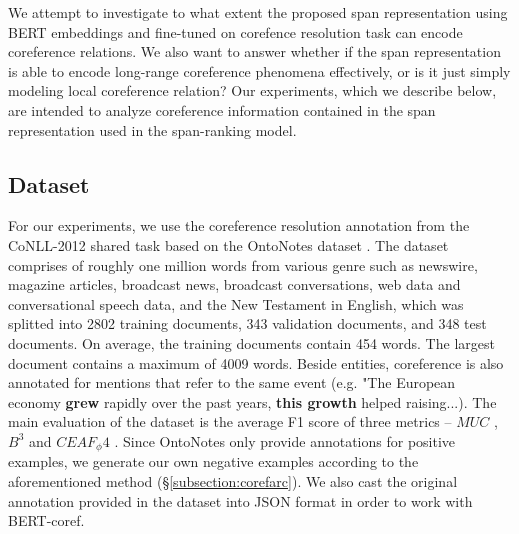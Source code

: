 \documentclass[11pt]{article}
\begin{document}


We attempt to investigate to what extent the proposed span representation using BERT embeddings and fine-tuned on corefence resolution task can encode coreference relations. We also want to answer whether if the span representation is able to encode long-range coreference phenomena effectively, or is it just simply modeling local coreference relation? Our experiments, which we describe below, are intended to analyze coreference information contained in the span representation used in the span-ranking model. 

\subsection{Dataset}
For our experiments, we use the coreference resolution annotation
from the CoNLL-2012 shared task based on the OntoNotes dataset \parencite{conll}. The dataset comprises of roughly one million words from various genre such as newswire, magazine articles, broadcast news, broadcast conversations, web data and conversational speech data, and the New Testament in English, which was splitted into 2802 training documents, 343 validation documents, and 348 test documents. On average, the training documents contain 454 words. The largest document contains a maximum of 4009 words. Beside entities, coreference is also annotated for mentions that refer to the same event (e.g. "The European economy \textbf{grew} rapidly over the past years, \textbf{this growth} helped raising...). The main evaluation of the dataset is the average F1 score of three metrics – $MUC$ \parencite{vilain-etal-1995-model}, $B^3$ \parencite{Bagga98algorithmsfor} and $CEAF_ \phi4$ \parencite{luo-2005-coreference}. Since OntoNotes only provide annotations for positive examples, we generate our own negative examples according to the aforementioned method (\S \ref{subsection:corefarc}). We also cast the original annotation provided in the dataset into JSON format in order to work with BERT-coref. 
\end{document}
